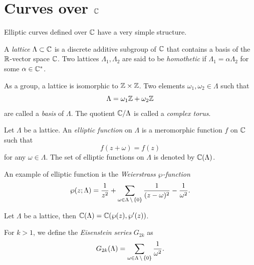 \section{Curves over \texorpdfstring{$\mathbb{C}$}{C}}
\label{sec:curves-over-c}
Elliptic curves defined over $\mathbb{C}$ have a very simple structure.

\begin{definition}[Lattice]
  A \emph{lattice} $\Lambda\subset\mathbb{C}$ is a discrete
  additive subgroup of $\mathbb{C}$ that contains a basis of the $\mathbb{R}$-vector
  space $\mathbb{C}$. Two lattices $\Lambda_1,\Lambda_2$ are said to be
  \emph{homothetic} if $\Lambda_1=\alpha\Lambda_2$ for some
  $\alpha\in\mathbb{C}^{\ast}$.
\end{definition}

As a group, a lattice is isomorphic to $\mathbb{Z}\times\mathbb{Z}$. Two elements
$\omega_1,\omega_2\in\Lambda$ such that
\begin{equation}
  \label{eq:135}
  \Lambda = \omega_1\mathbb{Z} + \omega_2\mathbb{Z}
\end{equation}
are called a \emph{basis} of $\Lambda$. The quotient $\mathbb{C}/\Lambda$ is
called a \emph{complex torus}.

\begin{definition}
  Let $\Lambda$ be a lattice. An
  \emph{elliptic function} on $\Lambda$ is a
  meromorphic function $f$ on $\mathbb{C}$ such that
  \begin{equation}
    \label{eq:141}
    f(z+\omega) = f(z)
  \end{equation}
  for any $\omega\in\Lambda$.  The set of elliptic functions on
  $\Lambda$ is denoted by $\mathbb{C}(\Lambda)$.
\end{definition}

An example of elliptic function is the
\emph{Weierstrass
  $\wp$-function}
\begin{equation}
  \label{eq:142}
  \wp(z;\Lambda) = \frac{1}{z^2} + \sum_{\omega\in\Lambda\,\backslash\,\{0\}}\frac{1}{(z-\omega)^2}-\frac{1}{\omega^2}
  \text{.}
\end{equation}
\begin{theorem}
  Let $\Lambda$ be a lattice, then $\mathbb{C}(\Lambda) = \mathbb{C}(\wp(z),\wp'(z))$.
\end{theorem}

For $k>1$, we define the \emph{Eisenstein
  series} $G_{2k}$ as
\begin{equation}
  \label{eq:143}
  G_{2k}(\Lambda) = \sum_{\omega\in\Lambda\,\backslash\,\{0\}}\frac{1}{\omega^2}
  \text{.}
\end{equation}

